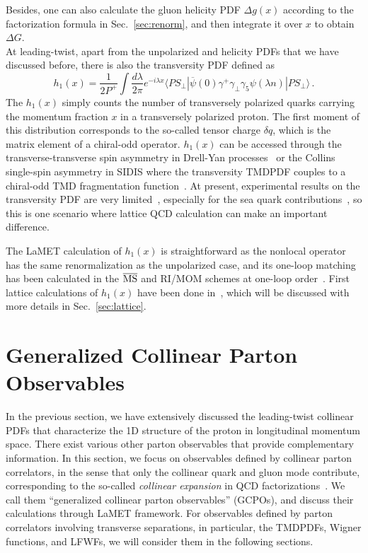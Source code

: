 \documentclass[aps,rmp,reprint,amsmath,amssymb,graphicx,longbibliography]{revtex4-1} %
\newcommand{\MS}{{\overline{\rm MS}}}
\DeclareRobustCommand{\sec}[1]{Sec.~\ref{sec:#1}}
\begin{document}
Besides, one can also calculate the gluon helicity PDF $\Delta g(x)$
according to the factorization formula in \sec{renorm}, and then integrate it over $x$ to obtain $\Delta G$.\\

At leading-twist, apart from the unpolarized
and helicity PDFs that we have discussed before, there is also the transversity
PDF defined as~\cite{Jaffe:1991kp,Jaffe:1991ra}
\begin{equation}
	h_1(x)\! =\! \frac{1}{2P^+}\!\int \frac{d\lambda}{2\pi}
	e^{-i\lambda x} \langle PS_\perp|\overline{\psi}(0)\gamma^+\gamma_\perp\gamma_5\psi(\lambda n)|PS_\perp\rangle \,.
\end{equation}
The $h_1(x)$ simply counts the number of transversely polarized quarks carrying
the momentum fraction $x$ in a transversely polarized proton.
The first moment of this distribution corresponds to the
so-called tensor charge $\delta q$, which is the matrix element of a chiral-odd operator. $h_1(x)$ can be accessed through the transverse-transverse spin asymmetry in Drell-Yan processes~\cite{Ralston:1979ys,Jaffe:1991kp,Jaffe:1991ra} or the Collins single-spin asymmetry in SIDIS where the transversity TMDPDF couples to a chiral-odd TMD fragmentation function~\cite{Collins:1992kk}.
At present, experimental results on the transversity PDF are very
limited~\cite{Barone:2001sp,Kang:2015msa,Lin:2017stx,Radici:2018iag,Cammarota:2020qcw}, especially for the sea quark contributions~\cite{Chang:2014jba}, so this is one scenario where lattice
QCD calculation can make an important difference.

The LaMET calculation of $h_1(x)$ is straightforward as the nonlocal operator has the same renormalization as the unpolarized case, and its one-loop matching has been calculated in the $\MS$ and RI/MOM schemes at one-loop order~\cite{Alexandrou:2018eet,Liu:2018hxv}. First lattice calculations of $h_1(x)$ have been done in~\cite{Chen:2016utp,Alexandrou:2018eet,Liu:2018hxv}, which will be discussed with more details in \sec{lattice}.


\section{Generalized Collinear Parton Observables}
\label{sec:gpo}
In the previous section, we have extensively discussed the leading-twist collinear PDFs
that characterize the 1D structure of the proton in longitudinal momentum space.
There exist various other parton observables that provide complementary information.
In this section, we focus on observables defined by collinear parton correlators, in the sense
that only the collinear quark and gluon mode contribute, corresponding to the so-called
{\it collinear expansion} in QCD factorizations~\cite{Sterman:1994ce,Collins:2011zzd}.
We call them ``generalized collinear parton observables'' (GCPOs), and discuss their
calculations through LaMET framework. For observables defined by parton correlators
involving transverse separations, in particular, the TMDPDFs, Wigner functions,
and LFWFs, we will consider them in the following sections.
\end{document}
